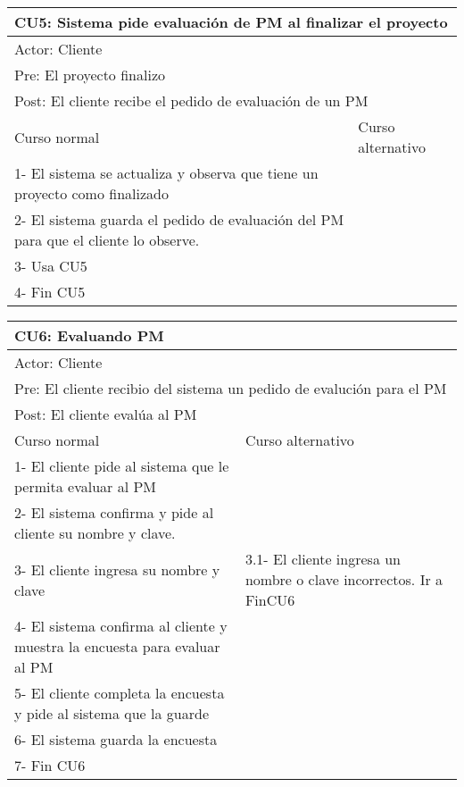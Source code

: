 \begin{table}[H]
  \begin{adjustbox}{max width = \textwidth}
  \begin{tabular}{|l|l|}
    \hline
    \multicolumn{2}{|l|}{CU5: Sistema pide evaluación de PM al finalizar el proyecto} \\\hline
    \multicolumn{2}{|l|}{Actor: Cliente} \\\hline
    \multicolumn{2}{|l|}{Pre: El proyecto finalizo} \\\hline
    \multicolumn{2}{|l|}{Post: El cliente recibe el pedido de evaluación de un PM} \\\hline
     Curso normal & Curso alternativo\\ \hline
     1- El sistema se actualiza y observa que tiene un proyecto como finalizado & \\ \hline
     2- El sistema guarda el pedido de evaluación del PM para que el cliente lo observe. &\\ \hline
     3- Usa CU5 &\\ \hline
     4- Fin CU5 & \\ \hline
  \end{tabular}
  \end{adjustbox}
\end{table}

\begin{table}[H]
  \begin{adjustbox}{max width = \textwidth}
  \begin{tabular}{|l|l|}
    \hline
    \multicolumn{2}{|l|}{CU6: Evaluando PM} \\\hline
    \multicolumn{2}{|l|}{Actor: Cliente} \\\hline
    \multicolumn{2}{|l|}{Pre: El cliente recibio del sistema un pedido de evalución para el PM} \\\hline
    \multicolumn{2}{|l|}{Post: El cliente evalúa al PM} \\\hline
     Curso normal & Curso alternativo\\ \hline
     1- El cliente pide al sistema que le permita evaluar al PM & \\ \hline
     2- El sistema confirma y pide al cliente su nombre y clave. & \\ \hline
     3- El cliente ingresa su nombre y clave & 3.1- El cliente ingresa un nombre o clave incorrectos. Ir a FinCU6\\ \hline
     4- El sistema confirma al cliente y muestra la encuesta para evaluar al PM & \\ \hline
     5- El cliente completa la encuesta y pide al sistema que la guarde & \\ \hline
     6- El sistema guarda la encuesta & \\ \hline
     7- Fin CU6 & \\ \hline
  \end{tabular}
  \end{adjustbox}
\end{table}


